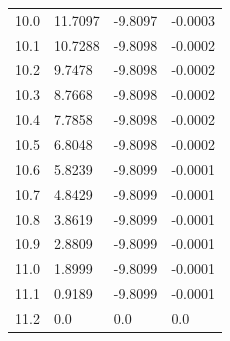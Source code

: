 \begin{tabular}{llll}
10.0 & 11.7097 & -9.8097 & -0.0003 \\
10.1 & 10.7288 & -9.8098 & -0.0002 \\
10.2 & 9.7478 & -9.8098 & -0.0002 \\
10.3 & 8.7668 & -9.8098 & -0.0002 \\
10.4 & 7.7858 & -9.8098 & -0.0002 \\
10.5 & 6.8048 & -9.8098 & -0.0002 \\
10.6 & 5.8239 & -9.8099 & -0.0001 \\
10.7 & 4.8429 & -9.8099 & -0.0001 \\
10.8 & 3.8619 & -9.8099 & -0.0001 \\
10.9 & 2.8809 & -9.8099 & -0.0001 \\
11.0 & 1.8999 & -9.8099 & -0.0001 \\
11.1 & 0.9189 & -9.8099 & -0.0001 \\
11.2 & 0.0 & 0.0 & 0.0 \\
\bottomrule
\end{tabular}
